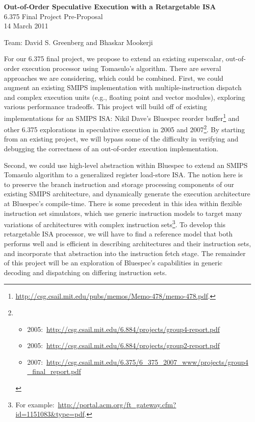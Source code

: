 \documentclass[12pt]{article}
\begin{document}
	\begin{center}
		\textbf{\large Out-of-Order Speculative Execution with a Retargetable ISA } \\
		6.375 Final Project Pre-Proposal\\
		14 March 2011 \\
		
		\vspace{\baselineskip}
		
		Team: David S. Greenberg and Bhaskar Mookerji
	\end{center}
	
	For our 6.375 final project, we propose to extend an existing superscalar, out-of-order execution processor using Tomasulo's algorithm. There are several approaches we are considering, which could be combined. First, we could augment an existing SMIPS implementation with multiple-instruction dispatch and complex execution units (e.g., floating point and vector modules), exploring various performance tradeoffs. This project will build off of existing implementations for an SMIPS ISA: Nikil Dave's  Bluespec reorder buffer\footnote{\url{http://csg.csail.mit.edu/pubs/memos/Memo-478/memo-478.pdf}.} and other 6.375 explorations in speculative execution in 2005 and 2007\footnote{\begin{itemize}
		\item 2005:~\url{http://csg.csail.mit.edu/6.884/projects/group4-report.pdf}
		\item 2005:~\url{http://csg.csail.mit.edu/6.884/projects/group2-report.pdf}
		\item 2007:~\url{http://csg.csail.mit.edu/6.375/6_375_2007_www/projects/group4_final_report.pdf}
	\end{itemize}}. By starting from an existing project, we will bypass some of the difficulty in verifying and debugging the correctness of an out-of-order execution implementation. 
	
	Second, we could use high-level abstraction within Bluespec to extend an SMIPS Tomasulo algorithm to a generalized register load-store ISA. The notion here is to preserve the branch instruction and storage processing components of our existing SMIPS architecture, and dynamically generate the execution architecture at Bluespec's compile-time. There is some precedent in this idea within flexible instruction set simulators, which use generic instruction models to target many variations of architectures with complex instruction sets\footnote{For example:~\url{http://portal.acm.org/ft_gateway.cfm?id=1151083&type=pdf}.}. To develop this retargetable ISA processor, we will have to find a reference model that both performs well and is efficient in describing architectures and their instruction sets, and incorporate that abstraction into the instruction fetch stage. The remainder of this project will be an exploration of Bluespec's capabilities in generic decoding and dispatching on differing instruction sets.
	
\end{document}
